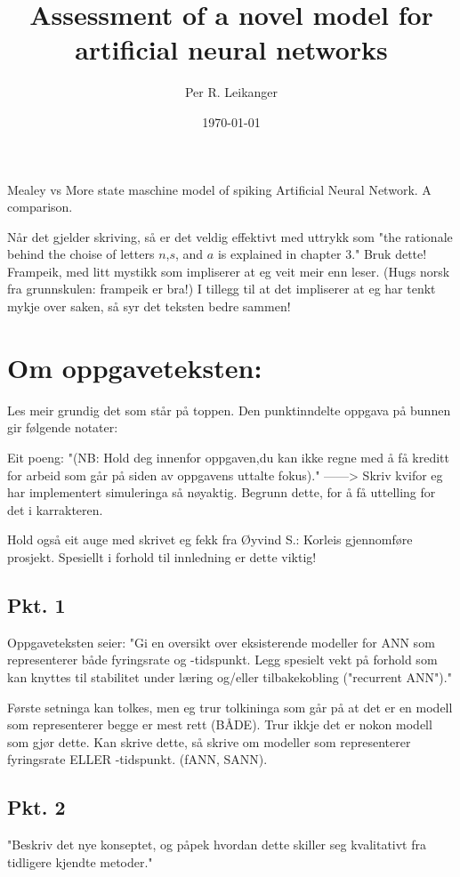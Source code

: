 \documentclass[a4paper,11 pt]{report}
\author{Per R. Leikanger}
\title{Assessment of a novel model for artificial neural networks}
\date{\today}
\begin{document}
   

\maketitle

Mealey vs More state maschine model of spiking Artificial Neural Network. A comparison.


Når det gjelder skriving, så er det veldig effektivt med uttrykk som "the rationale behind the choise of letters $n$,$s$, and $a$ is explained in chapter 3."
Bruk dette! 
Frampeik, med litt mystikk som impliserer at eg veit meir enn leser. (Hugs norsk fra grunnskulen: frampeik er bra!)
I tillegg til at det impliserer at eg har tenkt mykje over saken, så syr det teksten bedre sammen!


\chapter{Om oppgaveteksten:}
Les meir grundig det som står på toppen. Den punktinndelte oppgava på bunnen gir følgende notater:

Eit poeng: "(NB: Hold deg innenfor oppgaven,du kan ikke regne med å få
kreditt for arbeid som går på siden av oppgavens uttalte fokus)."
------> Skriv kvifor eg har implementert simuleringa så nøyaktig. Begrunn dette, for å få uttelling for det i karrakteren. 

Hold også eit auge med skrivet eg fekk fra Øyvind S.: Korleis gjennomføre prosjekt. Spesiellt i forhold til innledning er dette viktig!
	\section{Pkt. 1}
Oppgaveteksten seier: "Gi en oversikt over eksisterende modeller for ANN som representerer både fyringsrate og -tidspunkt. 
Legg spesielt vekt på forhold som kan knyttes til stabilitet under læring og/eller tilbakekobling ("recurrent ANN")."

Første setninga kan tolkes, men eg trur tolkininga som går på at det er en modell som representerer begge er mest rett (BÅDE). 
Trur ikkje det er nokon modell som gjør dette. Kan skrive dette, så skrive om modeller som representerer fyringsrate ELLER -tidspunkt. (fANN, SANN).


	\section{Pkt. 2}
"Beskriv det nye konseptet, og påpek hvordan dette skiller seg kvalitativt fra tidligere kjendte metoder."
\end{document}
